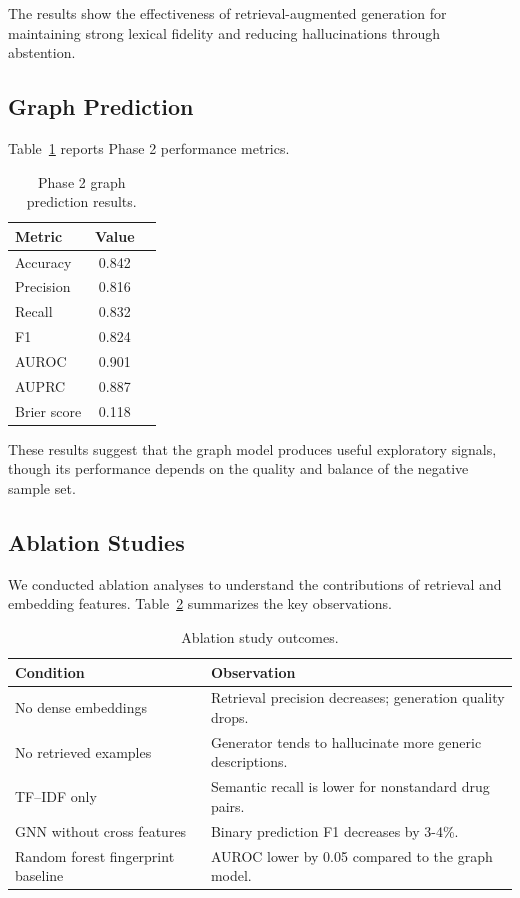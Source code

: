 \documentclass[conference]{IEEEtran}
\begin{document}
The results show the effectiveness of retrieval-augmented generation for maintaining strong lexical fidelity and reducing hallucinations through abstention.

\subsection{Graph Prediction}
Table~\ref{tab:gnn_results} reports Phase 2 performance metrics.

\begin{table}[t]
    \centering
    \caption{Phase 2 graph prediction results.}
    \label{tab:gnn_results}
    \begin{tabular}{@{}lcc@{}}
    \toprule
    Metric & Value \\
    \midrule
    Accuracy & 0.842 \\
    Precision & 0.816 \\
    Recall & 0.832 \\
    F1 & 0.824 \\
    AUROC & 0.901 \\
    AUPRC & 0.887 \\
    Brier score & 0.118 \\
    \bottomrule
    \end{tabular}
\end{table}

These results suggest that the graph model produces useful exploratory signals, though its performance depends on the quality and balance of the negative sample set.

\subsection{Ablation Studies}
We conducted ablation analyses to understand the contributions of retrieval and embedding features. Table~\ref{tab:ablation_results} summarizes the key observations.

\begin{table}[t]
    \centering
    \caption{Ablation study outcomes.}
    \label{tab:ablation_results}
    \begin{tabular}{@{}lp{5.5cm}@{}}
    \toprule
    Condition & Observation \\
    \midrule
    No dense embeddings & Retrieval precision decreases; generation quality drops. \\
    No retrieved examples & Generator tends to hallucinate more generic descriptions. \\
    TF--IDF only & Semantic recall is lower for nonstandard drug pairs. \\
    GNN without cross features & Binary prediction F1 decreases by 3-4\%. \\
    Random forest fingerprint baseline & AUROC lower by 0.05 compared to the graph model. \\
    \bottomrule
    \end{tabular}
\end{table}
\end{document}
